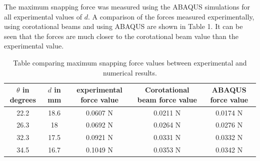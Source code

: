 \documentclass[10pt]{article}
\begin{document}
The maximum snapping force was measured using the ABAQUS simulations for all experimental values of $d$. A comparison of the forces measured experimentally, using corotational beams and using ABAQUS are shown in Table 1. It can be seen that the forces are much closer to the corotational beam value than the experimental value.
\begin{table}[h]
\centering
    \begin{tabular}{| c | c | c | c | c |}
    \hline
    $\theta$ in degrees & $d$ in mm & experimental force value & Corotational beam force value & ABAQUS force value \\ \hline
    22.2 & 18.6 & 0.0607 N & 0.0211 N & 0.0174 N \\ \hline
    26.3 & 18 & 0.0692 N & 0.0264 N & 0.0276 N \\ \hline
    32.3 & 17.5 & 0.0921 N & 0.0331 N & 0.0332 N \\ \hline
    34.5 & 16.7 & 0.1049 N & 0.0353 N & 0.0342 N \\
    \hline
    \end{tabular}
    \caption{Table comparing maximum snapping force values between experimental and numerical results.}
\end{table}
\end{document}
